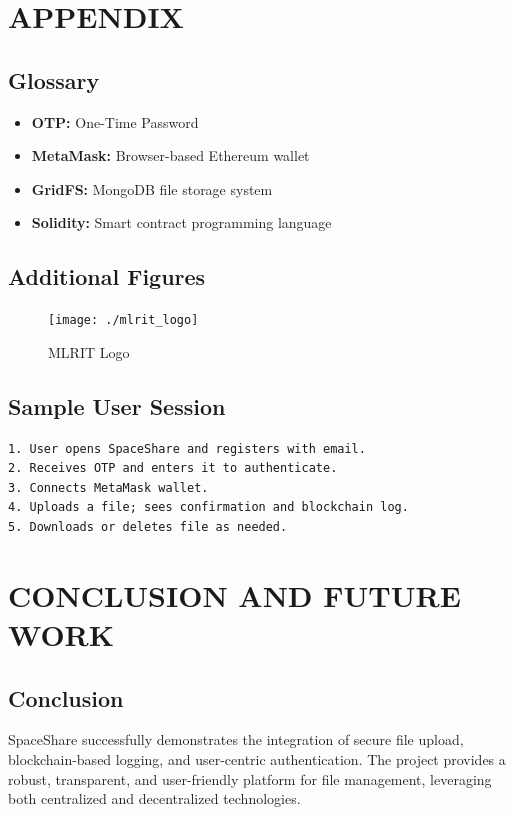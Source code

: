 \documentclass[a4paper, 12pt]{report}
\newenvironment{frontmatter}{}{}
\begin{document}
\begin{frontmatter}
\chapter{APPENDIX}
\section{Glossary}
\begin{itemize}
    \item \textbf{OTP:} One-Time Password
    \item \textbf{MetaMask:} Browser-based Ethereum wallet
    \item \textbf{GridFS:} MongoDB file storage system
    \item \textbf{Solidity:} Smart contract programming language
\end{itemize}

\section{Additional Figures}
\begin{figure}[H]
    \centering
    \texttt{[image: ./mlrit\_logo]}
    \caption{MLRIT Logo}
\end{figure}

\section{Sample User Session}
\begin{verbatim}
1. User opens SpaceShare and registers with email.
2. Receives OTP and enters it to authenticate.
3. Connects MetaMask wallet.
4. Uploads a file; sees confirmation and blockchain log.
5. Downloads or deletes file as needed.
\end{verbatim}

\chapter{CONCLUSION AND FUTURE WORK}
\section{Conclusion}
SpaceShare successfully demonstrates the integration of secure file upload, blockchain-based logging, and user-centric authentication. The project provides a robust, transparent, and user-friendly platform for file management, leveraging both centralized and decentralized technologies.


\end{frontmatter}
\end{document}
